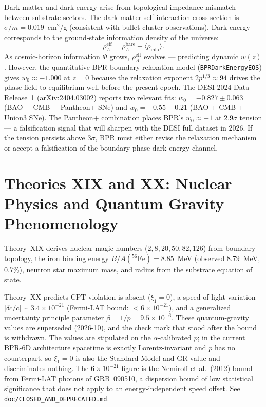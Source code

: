 \documentclass[12pt,oneside]{book}
\theoremstyle{definition}
\newcommand{\rhoinfo}{\rho_{\mathrm{info}}}
\begin{document}
Dark matter and dark energy arise from topological impedance mismatch between
substrate sectors. The dark matter self-interaction cross-section is
$\sigma/m = 0.019$~cm$^2$/g (consistent with bullet cluster observations).
Dark energy corresponds to the ground-state information density of the universe:
\begin{equation}
  \rho^\mathrm{eff}_\Lambda = \rho^\mathrm{bare}_\Lambda + \langle\rhoinfo\rangle.
\end{equation}
As cosmic-horizon information $\Phi$ grows, $\rho_\Lambda^\mathrm{eff}$ evolves ---
predicting dynamic $w(z)$.  However, the quantitative BPR boundary-relaxation model
(\texttt{BPRDarkEnergyEOS}) gives $w_0 \approx -1.000$ at $z=0$ because the relaxation
exponent $2p^{1/3} \approx 94$ drives the phase field to equilibrium well before the
present epoch.  The DESI 2024 Data Release~1 (arXiv:2404.03002) reports two relevant fits:
$w_0 = -0.827 \pm 0.063$ (BAO + CMB + Pantheon+ SNe) and $w_0 = -0.55 \pm 0.21$
(BAO + CMB + Union3 SNe).  The Pantheon+ combination places BPR's $w_0 \approx -1$ at
$2.9\sigma$ tension --- a falsification signal that will sharpen with the DESI full
dataset in 2026.  If the tension persists above $3\sigma$, BPR must either revise the
relaxation mechanism or accept a falsification of the boundary-phase dark-energy channel.

\section{Theories XIX and XX: Nuclear Physics and Quantum Gravity Phenomenology}

Theory~XIX derives nuclear magic numbers ($2, 8, 20, 50, 82, 126$) from boundary
topology, the iron binding energy $B/A({}^{56}\mathrm{Fe}) = 8.85$~MeV
(observed $8.79$~MeV, 0.7\%), neutron star maximum mass, and radius from the
substrate equation of state.

Theory~XX predicts CPT violation is absent ($\xi_1 = 0$), a speed-of-light
variation $|\delta c/c| \sim 3.4\times10^{-21}$ (Fermi-LAT bound:
$< 6\times10^{-21}$), and a generalized uncertainty principle
parameter $\beta = 1/p = 9.5\times10^{-6}$.
These quantum-gravity values are superseded (2026-10), and the check mark
that stood after the bound is withdrawn.  The values are stipulated on the
$\alpha$-calibrated $p$; in the current BPR-6D architecture spacetime is
exactly Lorentz-invariant and $p$ has no counterpart, so $\xi_1 = 0$ is
also the Standard Model and GR value and discriminates nothing.  The
$6\times10^{-21}$ figure is the Nemiroff et al.\ (2012) bound from
Fermi-LAT photons of GRB~090510, a dispersion bound of low statistical
significance that does not apply to an energy-independent speed offset.  See
\texttt{doc/CLOSED\_AND\_DEPRECATED.md}.
\end{document}
